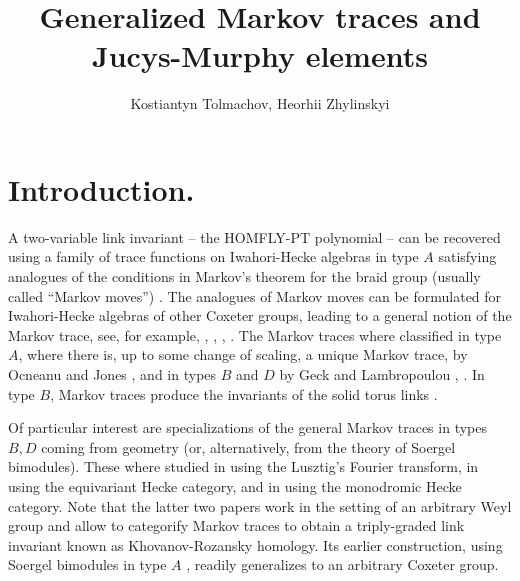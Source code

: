 \documentclass[11pt,leqno]{article}
\theoremstyle{definition}
\theoremstyle{definition}
\theoremstyle{remark}
\begin{document}
 \title{Generalized Markov traces and Jucys-Murphy elements}

\author{Kostiantyn Tolmachov, Heorhii Zhylinskyi} \date{}
\maketitle {}

\section{Introduction.}
A two-variable link invariant -- the HOMFLY-PT polynomial -- can be recovered using a family of trace functions on Iwahori-Hecke algebras in type $A$ satisfying analogues of the conditions in Markov's theorem for the braid group (usually called ``Markov moves'') \cite{jonesHeckeAlgebraRepresentations1987}. The analogues of Markov moves can be formulated for Iwahori-Hecke algebras of other Coxeter groups, leading to a general notion of the Markov trace, see, for example, \cite{geckTraceFunctionsIwahoriHecke1998}, \cite{geckMarkovTracesKnot2004}, \cite{gomi2006markov},  \cite{websterGeometryMarkovTraces2009}. The Markov traces where classified in type $A$, where there is, up to some change of scaling, a unique Markov trace, by Ocneanu and Jones \cite{jonesHeckeAlgebraRepresentations1987}, and in types $B$ and $D$ by Geck and Lambropoulou \cite{geckMarkovTracesKnot2004}, \cite{geckTraceFunctionsIwahoriHecke1998}. In type $B$, Markov traces produce the invariants of the solid torus links \cite{lambropoulou1994solid} \cite{geckMarkovTracesKnot2004}.

Of particular interest are specializations of the general Markov traces in types $B, D$ coming from geometry (or, alternatively, from the theory of Soergel bimodules). These where studied in \cite{gomi2006markov} using the Lusztig's Fourier transform, in \cite{websterGeometryMarkovTraces2009} using the equivariant Hecke category, and in \cite{bezrukavnikovMonodromicModelKhovanov2022} using the monodromic Hecke category. Note that the latter two papers work in the setting of an arbitrary Weyl group and allow to categorify Markov traces to obtain a triply-graded link invariant known as Khovanov-Rozansky homology. Its earlier construction, using Soergel bimodules in type $A$ \cite{khovanovTriplygradedLinkHomology2007}, readily generalizes to an arbitrary Coxeter group.
\end{document}
